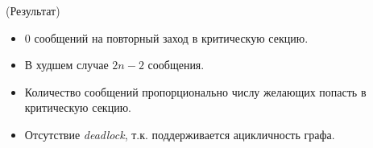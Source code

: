 \begin{remark} (Результат)
    \begin{itemize}
        \item 0 сообщений на повторный заход в критическую секцию.
        \item В худшем случае $2n-2$ сообщения.
        \item Количество сообщений пропорционально числу желающих попасть в 
            критическую секцию.
        \item Отсутствие \textit{deadlock}, т.к. поддерживается ацикличность графа.
    \end{itemize}
\end{remark}

